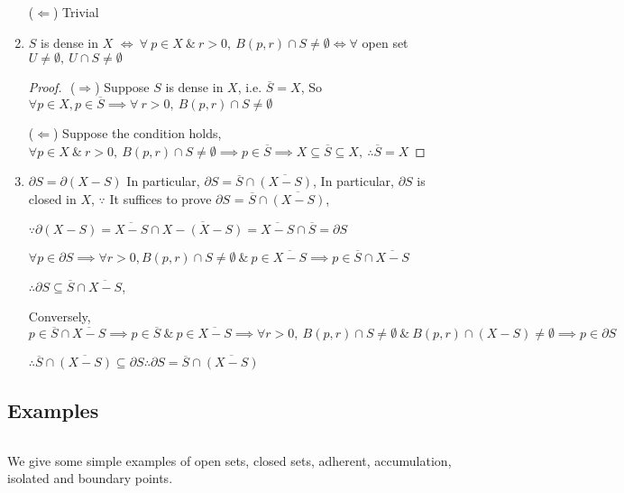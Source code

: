 \begin{enumerate}[wide,label=\textbf{(\arabic*). }]
	($\Leftarrow$) Trivial
	\item $S$ is dense in $X$ $\Leftrightarrow  ~\forall~p \in X ~\&~ r>0,~B(p,r) \cap S \neq \emptyset \Leftrightarrow  \forall$ open set $U \neq \emptyset,~U \cap S \neq \emptyset$
	\begin{proof}$ $
		($\Rightarrow$) Suppose $S$ is dense in $X$, i.e. $\overline{S} = X$, So $\forall p \in X, p \in \overline{S} \implies \forall~ r > 0,~B(p,r) \cap S \neq \emptyset$
		
		($\Leftarrow$) Suppose the condition holds, $\forall p \in X ~\&~ r > 0,~B(p,r) \cap S \neq \emptyset \implies p \in \overline{S} \implies X \subseteq \overline{S} \subseteq X,~\therefore \overline{S} = X$
	\end{proof}
	
	\item $\partial S = \partial(X - S)$ In particular, $\partial S = \overline{S} \cap \overline{(X - S)}$, In particular, $\partial S$ is closed in $X$, $\because$ It suffices to prove $\partial S$  = $\overline{S} \cap \overline{(X - S)}$,
	
	$\because \partial(X - S) = \overline{X - S} \cap \overline{X - (X - S)} = \overline{X - S} \cap \overline{S} = \partial S$
	
	$\forall p \in \partial S \implies \forall r > 0, B(p,r) \cap S \neq \emptyset ~\&~ p \in \overline{X - S} \implies p \in \overline{S} \cap \overline{X - S}$
	
	$\therefore \partial S \subseteq \overline{S} \cap \overline{X - S}$, 
	
	Conversely, $p \in \overline{S} \cap \overline{X - S} \implies p \in \overline{S} ~\&~ p \in \overline{X - S} \implies \forall r> 0,~B(p,r) \cap S \neq \emptyset ~\&~ B(p,r)\cap(X-S) \neq \emptyset \implies p\in \partial S$
	
	$\therefore \overline{S} \cap \overline{(X - S)} \subseteq \partial S \therefore \partial S = \overline{S} \cap \overline{(X - S)}$
\end{enumerate}

\subsection{Examples}$ $

We give some simple examples of open sets, closed sets, adherent, accumulation, isolated and boundary points.

